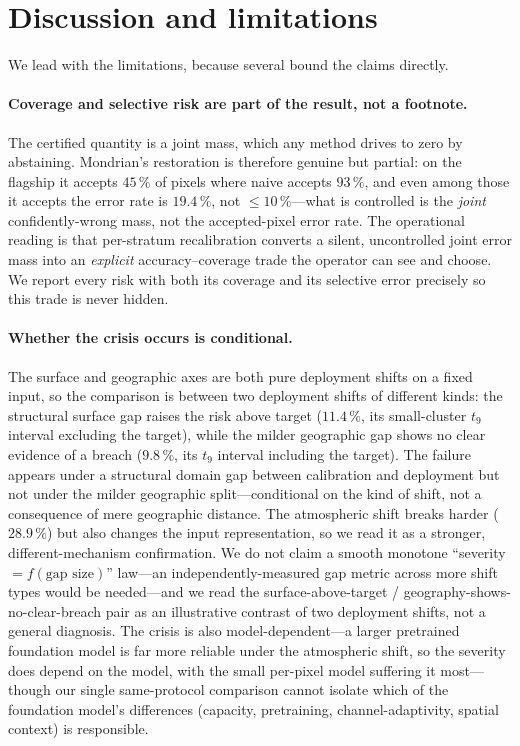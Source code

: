 \documentclass[preprint,3p,times]{elsarticle}
\begin{document}
\section{Discussion and limitations}
\label{sec:disc}
We lead with the limitations, because several bound the claims directly.

\paragraph{Coverage and selective risk are part of the result, not a footnote.} The certified quantity is a joint mass, which any method drives to zero by abstaining. Mondrian's restoration is therefore genuine but partial: on the flagship it accepts $45\,\%$ of pixels where naive accepts $93\,\%$, and even among those it accepts the error rate is $19.4\,\%$, not $\leq\!10\,\%$---what is controlled is the \emph{joint} confidently-wrong mass, not the accepted-pixel error rate. The operational reading is that per-stratum recalibration converts a silent, uncontrolled joint error mass into an \emph{explicit} accuracy--coverage trade the operator can see and choose. We report every risk with both its coverage and its selective error precisely so this trade is never hidden.

\paragraph{Whether the crisis occurs is conditional.} The surface and geographic axes are both pure deployment shifts on a fixed input, so the comparison is between two deployment shifts of different kinds: the structural surface gap raises the risk above target ($11.4\,\%$, its small-cluster $t_9$ interval excluding the target), while the milder geographic gap shows no clear evidence of a breach ($9.8\,\%$, its $t_9$ interval including the target). The failure appears under a structural domain gap between calibration and deployment but not under the milder geographic split---conditional on the kind of shift, not a consequence of mere geographic distance. The atmospheric shift breaks harder ($28.9\,\%$) but also changes the input representation, so we read it as a stronger, different-mechanism confirmation. We do not claim a smooth monotone ``severity $= f(\text{gap size})$'' law---an independently-measured gap metric across more shift types would be needed---and we read the surface-above-target / geography-shows-no-clear-breach pair as an illustrative contrast of two deployment shifts, not a general diagnosis. The crisis is also model-dependent---a larger pretrained foundation model is far more reliable under the atmospheric shift, so the severity does depend on the model, with the small per-pixel model suffering it most---though our single same-protocol comparison cannot isolate which of the foundation model's differences (capacity, pretraining, channel-adaptivity, spatial context) is responsible.
\end{document}
